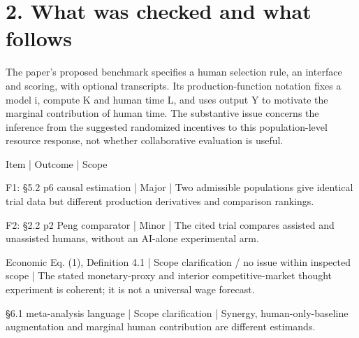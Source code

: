 \documentclass[10pt]{article}
\begin{document}
\section*{2. What was checked and what follows}
The paper’s proposed benchmark specifies a human selection rule, an interface and scoring, with optional transcripts. Its production-function notation fixes a model i, compute K and human time L, and uses output Y to motivate the marginal contribution of human time. The substantive issue concerns the inference from the suggested randomized incentives to this population-level resource response, not whether collaborative evaluation is useful.\par
Item | Outcome | Scope\par
F1: §5.2 p6 causal estimation | Major | Two admissible populations give identical trial data but different production derivatives and comparison rankings.\par
F2: §2.2 p2 Peng comparator | Minor | The cited trial compares assisted and unassisted humans, without an AI-alone experimental arm.\par
Economic Eq. (1), Definition 4.1 | Scope clarification / no issue within inspected scope | The stated monetary-proxy and interior competitive-market thought experiment is coherent; it is not a universal wage forecast.\par
§6.1 meta-analysis language | Scope clarification | Synergy, human-only-baseline augmentation and marginal human contribution are different estimands.\par
\end{document}
